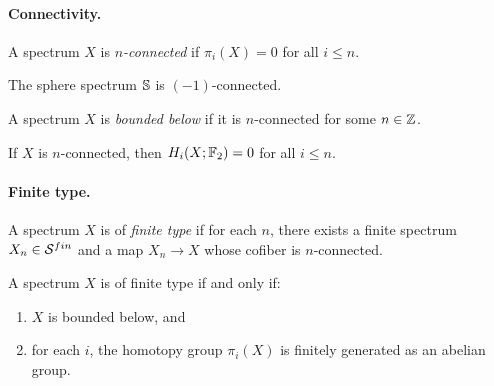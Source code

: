 \paragraph{Connectivity.}

\begin{definition}\label{prereq:def:connected}
    A spectrum $X$ is \emph{$n$-connected} if $\pi_i(X) = 0$ for all $i \le n$.
\end{definition}

\begin{axiom}\label{prereq:ax:sphere-connected}
    The sphere spectrum ${\mathbb S}$ is $(-1)$-connected.
\end{axiom}

\begin{definition}\label{prereq:def:bounded-below}
    \leanok
    A spectrum $X$ is \emph{bounded below} if it is $n$-connected for some $n \in {\mathbb Z}$.
\end{definition}

\begin{axiom}\label{prereq:ax:connected-homology-vanishing}
    If $X$ is $n$-connected, then $H_i(X; {\mathbb F}_2) = 0$ for all $i \le n$.
\end{axiom}

\paragraph{Finite type.}

\begin{definition}\label{prereq:def:finite-type}
    A spectrum $X$ is of \emph{finite type} if for each $n$, there exists a finite spectrum $X_n \in {\mathcal S}^{fin}$ and a map $X_n \to X$ whose cofiber is $n$-connected.
\end{definition}

\begin{axiom}\label{prereq:ax:finite-type-char}
    A spectrum $X$ is of finite type if and only if:
    \begin{enumerate}
        \item $X$ is bounded below, and
        \item for each $i$, the homotopy group $\pi_i(X)$ is finitely generated as an abelian group.
    \end{enumerate}
\end{axiom}

